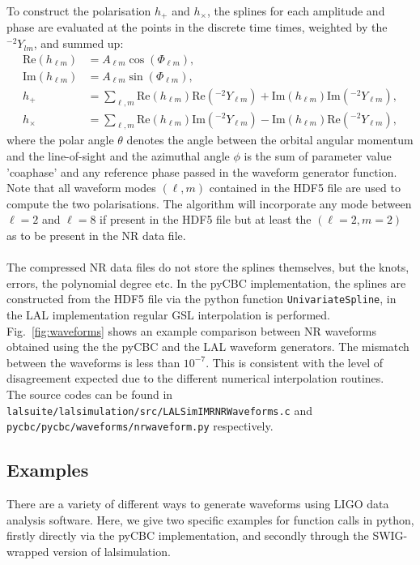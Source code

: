 \documentclass[aps,prd,amssymb,amsmath,amsfonts,superscriptaddress,
floatfix ,preprintnumbers,altaffilletter]{revtex4}
\begin{document}
To construct the polarisation $h_+$ and $h_\times$, the splines for each amplitude and phase are evaluated at the points in the discrete time times, 
weighted by the ${}^{-2}Y_{lm}$, and summed up:
\begin{align}
\label{}
    \mathrm{Re}(h_{\ell m}) &= A_{\ell m} \cos(\Phi_{\ell m}),   \\
    \mathrm{Im}(h_{\ell m}) &= A_{\ell m} \sin(\Phi_{\ell m}),   \\
    h_+ &= \sum_{\ell, m} \mathrm{Re}(h_{\ell m}) \mathrm{Re}({}^{-2}Y_{\ell m}) + \mathrm{Im}(h_{\ell m}) \mathrm{Im}({}^{-2}Y_{\ell m}), \\
    h_\times &= \sum_{\ell, m} \mathrm{Re}(h_{\ell m}) \mathrm{Im}({}^{-2}Y_{\ell m}) - \mathrm{Im}(h_{\ell m}) \mathrm{Re}({}^{-2}Y_{\ell m}),
\end{align}
where the polar angle $\theta$ denotes the angle between the orbital angular momentum and the line-of-sight and the azimuthal
angle $\phi$ is the sum of parameter value 'coa\textunderscore phase' and any reference phase passed in the waveform generator function.
\\
Note that all waveform modes $(\ell, m)$ contained in the HDF5 file are used
to compute the two polarisations. The algorithm will incorporate any mode between $\ell =2$ and $\ell =8$ if present in the
HDF5 file but at least the $(\ell=2, m=2)$ as to be present in the NR data file. \\
\\
The compressed NR data files do not store the splines themselves, but the knots, errors, the polynomial degree etc. In the pyCBC implementation,
the splines are constructed from the HDF5 file via the python function \texttt{UnivariateSpline}, in the LAL implementation regular GSL interpolation
is performed. Fig.~\ref{fig:waveforms} shows an example comparison between NR waveforms obtained using the the pyCBC and the LAL waveform generators. The mismatch
between the waveforms is less than $10^{-7}$. This is consistent with the level of disagreement expected due to the different numerical interpolation
routines. \\
The source codes can be found in \texttt{lalsuite/lalsimulation/src/LALSimIMRNRWaveforms.c} and 
\texttt{pycbc/pycbc/waveforms/nr\textunderscore waveform.py} respectively.

\subsection{Examples}
There are a variety of different ways to generate waveforms using LIGO data analysis software. Here, we give two specific examples
for function calls in python, firstly directly via the pyCBC implementation, and secondly through the SWIG-wrapped version of 
lalsimulation. 
\end{document}
